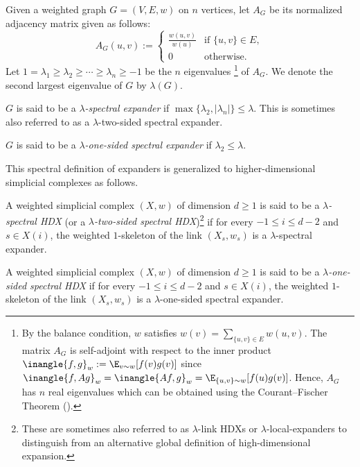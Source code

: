 \documentclass{toc}
\begin{document}
\begin{definition}  \label{def:spectral-expander}
Given %
a %
weighted graph $G=(V,E, w)$ on $n$ vertices, let $A_G$ be its
normalized adjacency matrix given as follows:
\[ A_G(u,v) := \begin{cases}
        \frac{w(u,v)}{w(u)} & \text{if } \{u,v\} \in E,\\
      0 & \text{otherwise.}
    \end{cases}
    \]
Let $1 = \lambda_1 \geq \lambda_2 \geq
\cdots \geq \lambda_n \geq -1$ be the $n$ eigenvalues%
%
%
%
%
%
%
%
%
\footnote{By the balance condition, $w$ satisfies
  $w(v) = \sum_{\{u,v\} \in E} w(u,v)$. The
  matrix $A_G$ is self-adjoint with respect to the
  inner product $\inangle{f,g}_w := \E_{v \sim w}[f(v) g(v)]$ since
  $\inangle{f,Ag}_w = \inangle{Af,g}_w = \E_{\{u,v\} \sim w}[f(u)
  g(v)]$. Hence, $A_G$ has $n$ real eigenvalues which can be
  obtained using the %
  Courant--Fischer Theorem ().}
 of $A_G$.  We denote the second largest
eigenvalue of $G$ %
by  %
$\lambda(G)$. 

$G$ is said to be a
\emph{$\lambda$-spectral expander} if $\max\{\lambda_2,|\lambda_n|\}
\leq \lambda$. This is sometimes also referred to as a
$\lambda$-two-sided spectral expander.

$G$ is said to be a
\emph{$\lambda$-one-sided spectral expander}
if $\lambda_2 \leq \lambda$.
\end{definition}

This spectral definition of expanders is generalized to
higher-dimensional  %
simplicial complexes as follows.

\begin{definition}\label{def:hdx}
  A weighted simplicial complex $(X,w)$ of dimension $d \geq 1$ is said to be a
  \emph{$\lambda$-spectral HDX} (or a
\emph{$\lambda$-two-sided spectral HDX})\footnote{These 
     are sometimes also referred
    to as $\lambda$-link HDXs or $\lambda$-local-expanders to
    distinguish from an alternative global definition of
    high-dimensional expansion.} if for every $-1\leq i \leq d-2$ and
  $s \in X(i)$, the weighted $1$-skeleton of the link $(X_s, w_s)$ is a
  $\lambda$-spectral expander.

A weighted simplicial complex $(X,w)$ of dimension $d \geq 1$ is said to be a
 \emph{$\lambda$-one-sided spectral HDX}
if for every $-1\leq i \leq d-2$ and
  $s \in X(i)$, the weighted $1$-skeleton of the link $(X_s,w_s)$ is a
  $\lambda$-one-sided spectral expander.
\end{definition}
\end{document}
